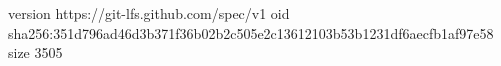 version https://git-lfs.github.com/spec/v1
oid sha256:351d796ad46d3b371f36b02b2c505e2c13612103b53b1231df6aecfb1af97e58
size 3505
